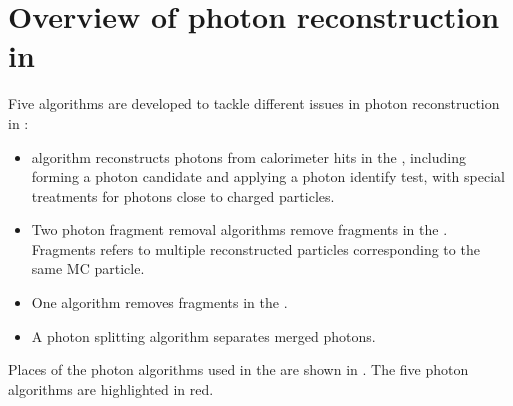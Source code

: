 
\section{Overview of photon reconstruction in \pandora}



Five algorithms are developed to tackle different issues in photon reconstruction in \pandora:
\begin{itemize}
  \item \PhotonReconstruction algorithm reconstructs photons from calorimeter hits in the \ECAL, including forming a photon candidate and applying a photon identify test, with special treatments for photons close to charged particles.
  \item Two photon fragment removal algorithms remove fragments in the \ECAL. Fragments refers to multiple reconstructed particles corresponding to the same MC particle.
  \item  One algorithm removes fragments in the \HCAL.
  \item A photon splitting algorithm separates merged photons.
\end{itemize}

Places of the photon algorithms used  in the \pandora are shown in . The five photon algorithms are highlighted in red.



